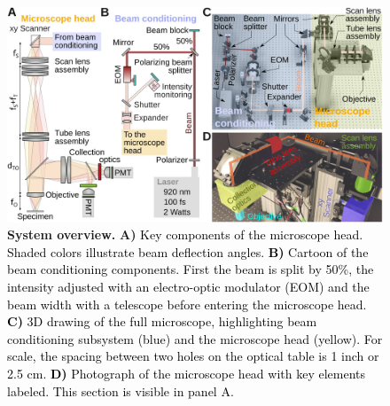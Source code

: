 \documentclass[10pt,letterpaper]{article}
\begin{document}
\begin{figure}[!t]
    \includegraphics[width=\textwidth]{fig1.jpg}
    \caption{{\bf System overview.} \textbf{A)} \textcolor{black}{Key components of the microscope head. Shaded colors illustrate beam deflection angles. \textbf{B)} Cartoon of the beam conditioning components. First the beam is split by 50\%, the intensity adjusted with an electro-optic modulator (EOM) and the beam width with a telescope before entering the microscope head. \textbf{C)} 3D drawing of the full microscope, highlighting beam conditioning subsystem (blue) and the microscope head (yellow). For scale, the spacing between two holes on the optical table is 1 inch or 2.5 cm. \textbf{D)} Photograph of the microscope head with key elements labeled. This section is visible in panel A.}}
    \label{fig1}
\end{figure}
\end{document}
